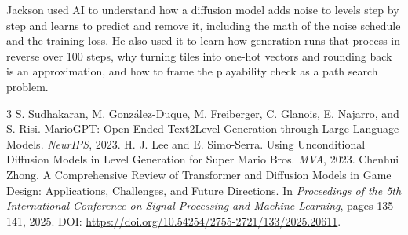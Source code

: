 \documentclass[11pt]{alt2027}
\begin{document}
Jackson used AI to understand how a diffusion model adds noise to levels step by step and learns to predict and remove it, including the math of the noise schedule and the training loss. He also used it to learn how generation runs that process in reverse over 100 steps, why turning tiles into one-hot vectors and rounding back is an approximation, and how to frame the playability check as a path search problem.

\begin{thebibliography}{3}
 S. Sudhakaran, M. Gonz\'alez-Duque, M. Freiberger, C. Glanois, E. Najarro, and S. Risi. MarioGPT: Open-Ended Text2Level Generation through Large Language Models. \emph{NeurIPS}, 2023.
 H. J. Lee and E. Simo-Serra. Using Unconditional Diffusion Models in Level Generation for Super Mario Bros. \emph{MVA}, 2023.
 Chenhui Zhong. A Comprehensive Review of Transformer and Diffusion Models in Game Design: Applications, Challenges, and Future Directions. In \emph{Proceedings of the 5th International Conference on Signal Processing and Machine Learning}, pages 135--141, 2025. DOI: \url{https://doi.org/10.54254/2755-2721/133/2025.20611}.
\end{thebibliography}
\end{document}
